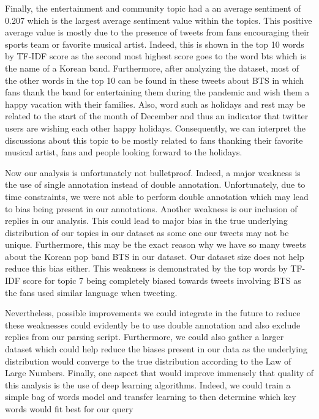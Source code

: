 \documentclass[letterpaper]{article} %
\begin{document}
Finally, the entertainment and community topic had a an average sentiment of 0.207 which is the largest average sentiment value within the topics. This positive average value is mostly due to the presence of tweets from fans encouraging their sports team or favorite musical artist. Indeed, this is shown in the top 10 words by TF-IDF score as the second most highest score goes to the word bts which is the name of a Korean band. Furthermore, after analyzing the dataset, most of the other words in the top 10 can be found in these tweets about BTS in which fans thank the band for entertaining them during the pandemic and wish them a happy vacation with their families. Also, word such as holidays and rest may be related to the start of the month of December and thus an indicator that twitter users are wishing each other happy holidays. Consequently, we can interpret the discussions about this topic to be mostly related to fans thanking their favorite musical artist, fans and people looking forward to the holidays.

Now our analysis is unfortunately not bulletproof. Indeed, a major weakness is the use of single annotation instead of double annotation. Unfortunately, due to time constraints, we were not able to perform double annotation which may lead to bias being present in our annotations. Another weakness is our inclusion of replies in our analysis. This could lead to major bias in the true underlying distribution of our topics in our dataset as some one our tweets may not be unique. Furthermore, this may be the exact reason why we have so many tweets about the Korean pop band BTS in our dataset. Our dataset size does not help reduce this bias either. This weakness is demonstrated by the top words by TF-IDF score for topic 7 being completely biased towards tweets involving BTS as the fans used similar language when tweeting.

Nevertheless, possible improvements we could integrate in the future to reduce these weaknesses could evidently be to use double annotation and also exclude replies from our parsing script. Furthermore, we could also gather a larger dataset which could help reduce the biases present in our data as the underlying distribution would converge to the true distribution according to the Law of Large Numbers. Finally, one aspect that would improve immensely that quality of this analysis is the use of deep learning algorithms. Indeed, we could train a simple bag of words model and transfer learning to then determine which key words would fit best for our query
\end{document}
